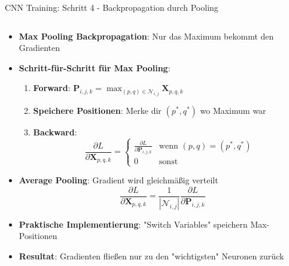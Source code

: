 \documentclass[aspectratio=1610, xcolor=dvipsnames, 9pt]{beamer}
\begin{document}
      \begin{frame}{CNN Training: Schritt 4 - Backpropagation durch Pooling}
        \begin{columns}
          \begin{column}{1\textwidth}
            \begin{itemize}
              \item \textbf{Max Pooling Backpropagation}: Nur das Maximum bekommt den Gradienten
              \item \textbf{Schritt-für-Schritt für Max Pooling}:
              \begin{enumerate}
                \item \textbf{Forward}: $\mathbf{P}_{i,j,k} = \max_{(p,q) \in \mathcal{N}_{i,j}} \mathbf{X}_{p,q,k}$
                \item \textbf{Speichere Positionen}: Merke dir $(p^*, q^*)$ wo Maximum war
                \item \textbf{Backward}:
                \begin{equation}
                  \frac{\partial L}{\partial \mathbf{X}_{p,q,k}} = \begin{cases}
                    \frac{\partial L}{\partial \mathbf{P}_{i,j,k}} & \text{wenn } (p,q) = (p^*, q^*) \\
                    0 & \text{sonst}
                  \end{cases}
                \end{equation}
              \end{enumerate}
              \item \textbf{Average Pooling}: Gradient wird gleichmäßig verteilt
              \begin{equation}
                \frac{\partial L}{\partial \mathbf{X}_{p,q,k}} = \frac{1}{|\mathcal{N}_{i,j}|} \frac{\partial L}{\partial \mathbf{P}_{i,j,k}}
              \end{equation}
              \item \textbf{Praktische Implementierung}: "Switch Variables" speichern Max-Positionen
              \item \textbf{Resultat}: Gradienten fließen nur zu den "wichtigsten" Neuronen zurück
            \end{itemize}
          \end{column}
        \end{columns}
      \end{frame}
\end{document}
